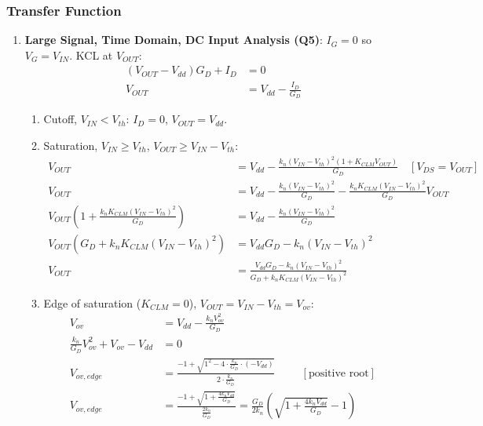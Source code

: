 \subsubsection{Transfer Function}
\begin{enumerate}
  \item \textbf{Large Signal, Time Domain, DC Input Analysis (Q5)}: \(I_G = 0\) so \(V_G = V_{IN}\).
    KCL at \(V_{OUT}\):
    \begin{align*}
      (V_{OUT} - V_{dd})G_D + I_D &= 0 \\
      V_{OUT} &= V_{dd} - \frac{I_D}{G_D} \tag{1}
    \end{align*}
    \begin{enumerate}
      \item Cutoff, \(V_{IN} < V_{th}\): \(I_D = 0\), \(V_{OUT} = V_{dd}\).
      \item Saturation, \(V_{IN} \geq V_{th}\), \(V_{OUT} \geq V_{IN} - V_{th}\):
        \begin{align*}
          V_{OUT} &= V_{dd} - \frac{k_n (V_{IN} - V_{th})^2 (1 + K_{CLM} V_{OUT})}{G_D} \quad [V_{DS} = V_{OUT}] \\
          V_{OUT} &= V_{dd} - \frac{k_n (V_{IN} - V_{th})^2}{G_D} - \frac{k_n K_{CLM} (V_{IN} - V_{th})^2}{G_D} V_{OUT} \\
          V_{OUT}\left(1 + \frac{k_n K_{CLM} (V_{IN} - V_{th})^2}{G_D}\right) &= V_{dd} - \frac{k_n (V_{IN} - V_{th})^2}{G_D} \\
          V_{OUT}\left(G_D + k_n K_{CLM} (V_{IN} - V_{th})^2\right) &= V_{dd} G_D - k_n (V_{IN} - V_{th})^2 \\
          V_{OUT} &= \frac{V_{dd} G_D - k_n (V_{IN} - V_{th})^2}{G_D + k_n K_{CLM} (V_{IN} - V_{th})^2}
        \end{align*}
      \item Edge of saturation (\(K_{CLM} = 0\)), \(V_{OUT} = V_{IN} - V_{th} = V_{ov}\):
        \begin{align*}
          V_{ov} &= V_{dd} - \frac{k_n V_{ov}^2}{G_D} \\
          \frac{k_n}{G_D} V_{ov}^2 + V_{ov} - V_{dd} &= 0 \\
          V_{ov,edge} &= \frac{-1 + \sqrt{1^2 - 4 \cdot \frac{k_n}{G_D} \cdot (-V_{dd})}}{2 \cdot \frac{k_n}{G_D}} \hspace{1cm} [\text{positive root}] \\
          V_{ov,edge} &= \frac{-1 + \sqrt{1 + \frac{4 k_n V_{dd}}{G_D}}}{\frac{2 k_n}{G_D}} = \frac{G_D}{2 k_n}\left(\sqrt{1 + \frac{4 k_n V_{dd}}{G_D}} - 1\right)

\end{align*}
\end{enumerate}
\end{enumerate}
